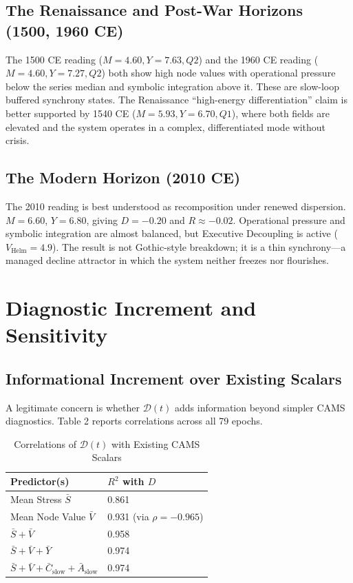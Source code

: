\documentclass[11pt,a4paper]{article}
\begin{document}
\subsection{The Renaissance and Post-War Horizons (1500, 1960 CE)}
The 1500 CE reading (\(M=4.60,Y=7.63,Q2\)) and the 1960 CE reading (\(M=4.60,Y=7.27,Q2\)) both show high node values with operational pressure below the series median and symbolic integration above it. These are slow-loop buffered synchrony states. The Renaissance ``high-energy differentiation'' claim is better supported by 1540 CE (\(M=5.93,Y=6.70,Q1\)), where both fields are elevated and the system operates in a complex, differentiated mode without crisis.

\subsection{The Modern Horizon (2010 CE)}
The 2010 reading is best understood as recomposition under renewed dispersion. \(M=6.60\), \(Y=6.80\), giving \(D=-0.20\) and \(R\approx-0.02\). Operational pressure and symbolic integration are almost balanced, but Executive Decoupling is active (\(V_{\text{Helm}}=4.9\)). The result is not Gothic-style breakdown; it is a thin synchrony---a managed decline attractor in which the system neither freezes nor flourishes.

\section{Diagnostic Increment and Sensitivity}

\subsection{Informational Increment over Existing Scalars}
A legitimate concern is whether \(\mathcal{D}(t)\) adds information beyond simpler CAMS diagnostics. Table 2 reports correlations across all 79 epochs.

\begin{table}[htbp]
\centering
\caption{Correlations of \(\mathcal{D}(t)\) with Existing CAMS Scalars}
\begin{tabular}{ll}
\toprule
Predictor(s) & \(R^2\) with \(D\) \\
\midrule
Mean Stress \(\bar{S}\) & 0.861 \\
Mean Node Value \(\bar{V}\) & 0.931 (via \(\rho=-0.965\)) \\
\(\bar{S}+\bar{V}\) & 0.958 \\
\(\bar{S}+\bar{V}+\bar{Y}\) & 0.974 \\
\(\bar{S}+\bar{V}+\bar{C}_{\text{slow}}+\bar{A}_{\text{slow}}\) & 0.974 \\
\bottomrule
\end{tabular}
\end{table}
\end{document}
